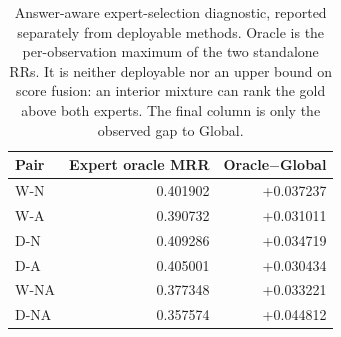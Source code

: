 \begin{table}[htbp]
\centering\footnotesize
\setlength{\tabcolsep}{4pt}
\caption{Answer-aware expert-selection diagnostic, reported separately from deployable methods. Oracle is the per-observation maximum of the two standalone RRs. It is neither deployable nor an upper bound on score fusion: an interior mixture can rank the gold above both experts. The final column is only the observed gap to Global.}
\label{tab:matched-oracle}
\begin{tabular}{lrr}
\toprule
Pair & Expert oracle MRR & Oracle$-$Global\\
\midrule
W-N & 0.401902 & +0.037237\\
W-A & 0.390732 & +0.031011\\
D-N & 0.409286 & +0.034719\\
D-A & 0.405001 & +0.030434\\
W-NA & 0.377348 & +0.033221\\
D-NA & 0.357574 & +0.044812\\
\bottomrule
\end{tabular}
\end{table}
